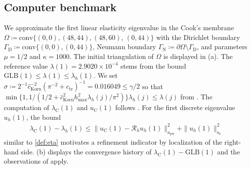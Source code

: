 \documentclass[a4paper]{amsart}
\numberwithin{equation}{section}
\renewcommand{\d}[1]{\,\mathrm{d}#1}
\renewcommand{\div}{\mathrm{div}}
\newcommand{\Mcal}{\mathcal{M}}
\newcommand{\s}{\mathrm{s}}
\newcommand{\pw}{\mathrm{pw}}
\theoremstyle{remark}
\theoremstyle{definition}
\theoremstyle{assumptionnoperiod}
\begin{document}
\subsection{Computer benchmark}\label{sec:ex-linear-elast}
We approximate the first linear elasticity eigenvalue in the Cook's membrane $\Omega \coloneqq \mathrm{conv}\{(0,0), (48,44), (48,60)$, $(0,44)\}$ with the Dirichlet boundary $\Gamma_\mathrm{D} \coloneq \mathrm{conv}\{(0,0), (0,44)\}$, Neumann boundary $\Gamma_\mathrm{N} \coloneqq \partial \Omega \setminus \Gamma_\mathrm{D}$, and parameters $\mu = 1/2$ and $\kappa = 1000$. The initial triangulation of $\Omega$ is displayed in (a). The reference value $\lambda(1) = 2.9020 \times 10^{-4}$ stems from the bound $\mathrm{GLB}(1) \leq \lambda(1) \leq \lambda_h(1)$.
We set $\sigma \coloneqq 2^{-1}\hat{c}_\mathrm{Korn}^{-2}(\pi^{-2} + c_\mathrm{tr})^{-1} = 0.016049 \leq \gamma/2$ so that $\min\{1,1/(1/2 + \hat{c}_\mathrm{Korn}^2 h_\mathrm{max}^2\lambda_h(j)/\pi^2)\}\lambda_h(j) \leq \lambda(j)$ from . The computation of $\lambda_\mathrm{C}(1)$ and $u_\mathrm{C}(1)$ follows . For the first discrete eigenvalue $u_h(1)$, the bound
\begin{align*}
	\lambda_\mathrm{C}(1) - \lambda_h(1) \leq \|u_\mathrm{C}(1) - \mathcal{R}_h u_h(1)\|^2_{a_\pw} + \|u_h(1)\|_{\s_h}^2
\end{align*}
similar to \eqref{def:eta} motivates a refinement indicator by localization of the right-hand side.
(b) displays the convergence history of $\lambda_\mathrm{C}(1) - \mathrm{GLB}(1)$ and the observations of 
 apply.

%
\end{document}
